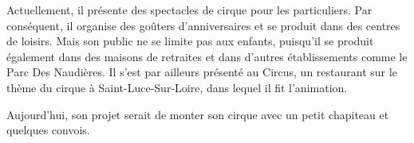 Actuellement, il présente des spectacles de cirque pour les particuliers. Par conséquent, il organise des goûters d’anniversaires et se produit dans des centres de loisirs. Mais son public ne se limite pas aux enfants, puisqu'il se produit également dans des maisons de retraites et dans d’autres établissements comme le Parc Des Naudières. Il s’est par ailleurs présenté au Circus, un restaurant sur le thème du cirque à Saint-Luce-Sur-Loire, dans lequel il fit l’animation. 

Aujourd'hui, son projet serait de monter son cirque avec un petit chapiteau et quelques convois. 






\thispagestyle{empty} %
